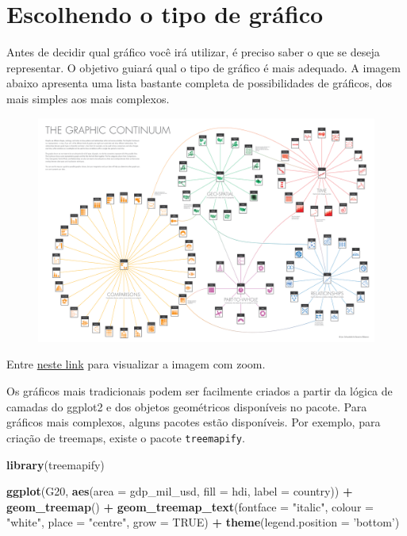 \documentclass[]{book}
\newenvironment{Shaded}{\begin{snugshade}}{\end{snugshade}}
\newcommand{\KeywordTok}[1]{\textcolor[rgb]{0.13,0.29,0.53}{\textbf{#1}}}
\newcommand{\DataTypeTok}[1]{\textcolor[rgb]{0.13,0.29,0.53}{#1}}
\newcommand{\StringTok}[1]{\textcolor[rgb]{0.31,0.60,0.02}{#1}}
\newcommand{\OtherTok}[1]{\textcolor[rgb]{0.56,0.35,0.01}{#1}}
\newcommand{\OperatorTok}[1]{\textcolor[rgb]{0.81,0.36,0.00}{\textbf{#1}}}
\newcommand{\NormalTok}[1]{#1}
\begin{document}
\section{Escolhendo o tipo de
gráfico}\label{escolhendo-o-tipo-de-grafico}

Antes de decidir qual gráfico você irá utilizar, é preciso saber o que
se deseja representar. O objetivo guiará qual o tipo de gráfico é mais
adequado. A imagem abaixo apresenta uma lista bastante completa de
possibilidades de gráficos, dos mais simples aos mais complexos.

\begin{figure}
\centering
\includegraphics{images/tipo_graficos.png}
\caption{}
\end{figure}

Entre
\href{https://camo.githubusercontent.com/ea2e9eda9b01fafc1213f5c400aa357584f40df8/687474703a2f2f626c6f672e76697375616c2e6c792f77702d636f6e74656e742f75706c6f6164732f323031342f30392f696d6167652d362e706e67}{neste
link} para visualizar a imagem com zoom.

Os gráficos mais tradicionais podem ser facilmente criados a partir da
lógica de camadas do ggplot2 e dos objetos geométricos disponíveis no
pacote. Para gráficos mais complexos, alguns pacotes estão disponíveis.
Por exemplo, para criação de treemaps, existe o pacote
\texttt{treemapify}.

\begin{Shaded}
\begin{Highlighting}[]
\KeywordTok{library}\NormalTok{(treemapify)}

\KeywordTok{ggplot}\NormalTok{(G20, }\KeywordTok{aes}\NormalTok{(}\DataTypeTok{area =}\NormalTok{ gdp_mil_usd, }\DataTypeTok{fill =}\NormalTok{ hdi, }\DataTypeTok{label =}\NormalTok{ country)) }\OperatorTok{+}
\StringTok{  }\KeywordTok{geom_treemap}\NormalTok{() }\OperatorTok{+}
\StringTok{  }\KeywordTok{geom_treemap_text}\NormalTok{(}\DataTypeTok{fontface =} \StringTok{"italic"}\NormalTok{, }\DataTypeTok{colour =} \StringTok{"white"}\NormalTok{, }\DataTypeTok{place =} \StringTok{"centre"}\NormalTok{,}
                    \DataTypeTok{grow =} \OtherTok{TRUE}\NormalTok{) }\OperatorTok{+}
\StringTok{  }\KeywordTok{theme}\NormalTok{(}\DataTypeTok{legend.position =} \StringTok{'bottom'}\NormalTok{)}
\end{Highlighting}
\end{Shaded}
\end{document}
